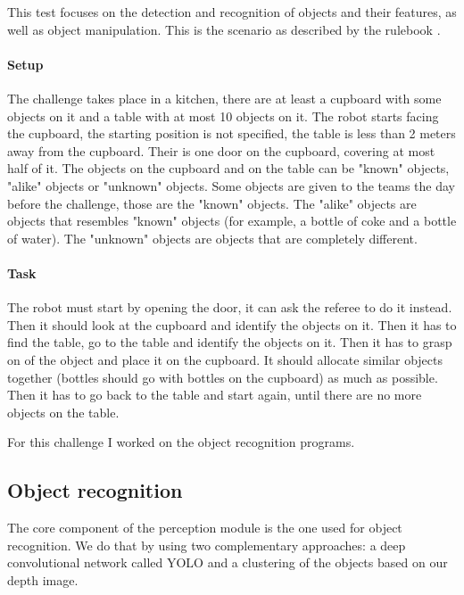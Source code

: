 \documentclass[a4paper, twocolumn]{article}
\begin{document}
        This test focuses on the detection and recognition of objects and their features, as well as object manipulation. This is the scenario as described by the rulebook \cite{rulebook2017}.\\

    \paragraph{Setup} The challenge takes place in a kitchen, there are at least a cupboard with some objects on it and a table with at most 10 objects on it. The robot starts facing the cupboard, the starting position is not specified, the table is less than 2 meters away from the cupboard. Their is one door on the cupboard, covering at most half of it. The objects on the cupboard and on the table can be "known" objects, "alike" objects or "unknown" objects. Some objects are given to the teams the day before the challenge, those are the "known" objects. The "alike" objects are objects that resembles "known" objects (for example, a bottle of coke and a bottle of water). The "unknown" objects are objects that are completely different.

    \paragraph{Task} The robot must start by opening the door, it can ask the referee to do it instead. Then it should look at the cupboard and identify the objects on it. Then it has to find the table, go to the table and identify the objects on it. Then it has to grasp on of the object and place it on the cupboard. It should allocate similar objects together (bottles should go with bottles on the cupboard) as much as possible. Then it has to go back to the table and start again, until there are no more objects on the table.
    
    For this challenge I worked on the object recognition programs.

    \subsection{Object recognition}

    The core component of the perception module is the one used for object recognition. We do that by using two complementary approaches: a deep convolutional network called YOLO\cite{redmon2016yolo9000} and a clustering of the objects based on our depth image.
\end{document}
